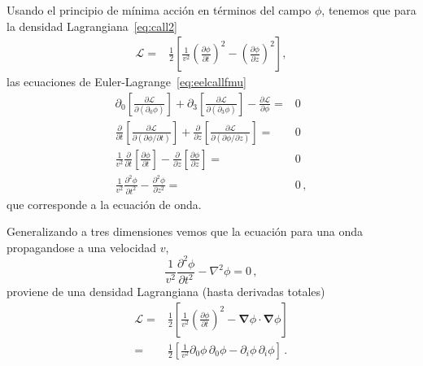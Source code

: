 Usando el principio de mínima acción en términos del campo $\phi$, tenemos que para la densidad Lagrangiana~\eqref{eq:call2}
\begin{align}
  \mathcal{L}=&\frac{1}{2}  \left[
  \frac{1}{v^2}\left(\frac{\partial\phi}{\partial t}\right)^2-\left(\frac{\partial\phi}{\partial z}\right)^2
\right],
\end{align}
las ecuaciones de Euler-Lagrange~\eqref{eq:eelcallfmu}
\begin{align}
  \partial_0\left[\frac{\partial\mathcal{L}}{\partial(\partial_0\phi)}\right]+
\partial_3\left[\frac{\partial\mathcal{L}}{\partial(\partial_3\phi)}\right]
-\frac{\partial\mathcal{L}}{\partial\phi}=&0\nonumber\\
  \frac{\partial}{\partial t}\left[\frac{\partial\mathcal{L}}{\partial(\partial\phi/\partial t)}\right]+
\frac{\partial}{\partial z}\left[\frac{\partial\mathcal{L}}{\partial(\partial\phi/\partial z)}\right]
=&0\nonumber\\
 \frac{1}{v^2}\frac{\partial}{\partial t}\left[\frac{\partial\phi}{\partial t}\right]
-\frac{\partial}{\partial z}\left[\frac{\partial\phi}{\partial z}\right]=&0\nonumber\\
 \frac{1}{v^2}\frac{\partial^2\phi}{\partial t^2}-\frac{\partial^2\phi}{\partial z^2}=&0\,,
\end{align}
que corresponde a la ecuación de onda.

Generalizando a tres dimensiones vemos que la ecuación para una onda propagandose a una velocidad $v$,
\begin{equation}
     \frac{1}{v^2}\frac{\partial^2\phi}{\partial t^2}-\nabla^2\phi=0\,,
\end{equation}
proviene de una densidad Lagrangiana (hasta derivadas totales)
\begin{align}
    \mathcal{L}=&\frac{1}{2}\left[
\frac{1}{v^2}\left(\frac{\partial\phi}{\partial t}
  \right)^2-\boldsymbol{\nabla}\phi\cdot\boldsymbol{\nabla}\phi \right]\nonumber\\
    =&\frac{1}{2}\left[
      \frac{1}{v^2}{\partial_0\phi}\,{\partial_0\phi}-{\partial_i\phi}\,{\partial_i\phi}
   \right]\,.
\end{align}

